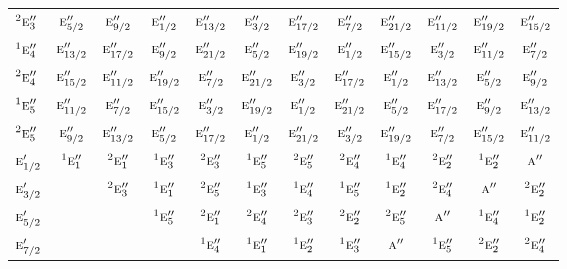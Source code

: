 \documentclass[10pt,a4paper]{article}
\numberwithin{equation}{section}
\newcommand{\irr}[1]{\text{\normalfont\scshape #1}}
\newcommand{\conjpair}[1]{{}^{#1}}
\begin{document}
{\begin{longtable}{@{}lccccccccccc@{}}
$\conjpair{2}\irr{e}_{3}''$ & $\irr{e}_{5/2}''$ & $\irr{e}_{9/2}''$ & $\irr{e}_{1/2}''$ & $\irr{e}_{13/2}''$ & $\irr{e}_{3/2}''$ & $\irr{e}_{17/2}''$ & $\irr{e}_{7/2}''$ & $\irr{e}_{21/2}''$ & $\irr{e}_{11/2}''$ & $\irr{e}_{19/2}''$ & $\irr{e}_{15/2}''$\\
$\conjpair{1}\irr{e}_{4}''$ & $\irr{e}_{13/2}''$ & $\irr{e}_{17/2}''$ & $\irr{e}_{9/2}''$ & $\irr{e}_{21/2}''$ & $\irr{e}_{5/2}''$ & $\irr{e}_{19/2}''$ & $\irr{e}_{1/2}''$ & $\irr{e}_{15/2}''$ & $\irr{e}_{3/2}''$ & $\irr{e}_{11/2}''$ & $\irr{e}_{7/2}''$\\
$\conjpair{2}\irr{e}_{4}''$ & $\irr{e}_{15/2}''$ & $\irr{e}_{11/2}''$ & $\irr{e}_{19/2}''$ & $\irr{e}_{7/2}''$ & $\irr{e}_{21/2}''$ & $\irr{e}_{3/2}''$ & $\irr{e}_{17/2}''$ & $\irr{e}_{1/2}''$ & $\irr{e}_{13/2}''$ & $\irr{e}_{5/2}''$ & $\irr{e}_{9/2}''$\\
$\conjpair{1}\irr{e}_{5}''$ & $\irr{e}_{11/2}''$ & $\irr{e}_{7/2}''$ & $\irr{e}_{15/2}''$ & $\irr{e}_{3/2}''$ & $\irr{e}_{19/2}''$ & $\irr{e}_{1/2}''$ & $\irr{e}_{21/2}''$ & $\irr{e}_{5/2}''$ & $\irr{e}_{17/2}''$ & $\irr{e}_{9/2}''$ & $\irr{e}_{13/2}''$\\
$\conjpair{2}\irr{e}_{5}''$ & $\irr{e}_{9/2}''$ & $\irr{e}_{13/2}''$ & $\irr{e}_{5/2}''$ & $\irr{e}_{17/2}''$ & $\irr{e}_{1/2}''$ & $\irr{e}_{21/2}''$ & $\irr{e}_{3/2}''$ & $\irr{e}_{19/2}''$ & $\irr{e}_{7/2}''$ & $\irr{e}_{15/2}''$ & $\irr{e}_{11/2}''$\\
$\irr{e}_{1/2}'$ & $\conjpair{1}\irr{e}_{1}''$ & $\conjpair{2}\irr{e}_{1}''$ & $\conjpair{1}\irr{e}_{3}''$ & $\conjpair{2}\irr{e}_{3}''$ & $\conjpair{1}\irr{e}_{5}''$ & $\conjpair{2}\irr{e}_{5}''$ & $\conjpair{2}\irr{e}_{4}''$ & $\conjpair{1}\irr{e}_{4}''$ & $\conjpair{2}\irr{e}_{2}''$ & $\conjpair{1}\irr{e}_{2}''$ & $\irr{a}''$\\
$\irr{e}_{3/2}'$ &  & $\conjpair{2}\irr{e}_{3}''$ & $\conjpair{1}\irr{e}_{1}''$ & $\conjpair{2}\irr{e}_{5}''$ & $\conjpair{1}\irr{e}_{3}''$ & $\conjpair{1}\irr{e}_{4}''$ & $\conjpair{1}\irr{e}_{5}''$ & $\conjpair{1}\irr{e}_{2}''$ & $\conjpair{2}\irr{e}_{4}''$ & $\irr{a}''$ & $\conjpair{2}\irr{e}_{2}''$\\
$\irr{e}_{5/2}'$ &  &  & $\conjpair{1}\irr{e}_{5}''$ & $\conjpair{2}\irr{e}_{1}''$ & $\conjpair{2}\irr{e}_{4}''$ & $\conjpair{2}\irr{e}_{3}''$ & $\conjpair{2}\irr{e}_{2}''$ & $\conjpair{2}\irr{e}_{5}''$ & $\irr{a}''$ & $\conjpair{1}\irr{e}_{4}''$ & $\conjpair{1}\irr{e}_{2}''$\\
$\irr{e}_{7/2}'$ &  &  &  & $\conjpair{1}\irr{e}_{4}''$ & $\conjpair{1}\irr{e}_{1}''$ & $\conjpair{1}\irr{e}_{2}''$ & $\conjpair{1}\irr{e}_{3}''$ & $\irr{a}''$ & $\conjpair{1}\irr{e}_{5}''$ & $\conjpair{2}\irr{e}_{2}''$ & $\conjpair{2}\irr{e}_{4}''$\\

\end{longtable}}
\end{document}
